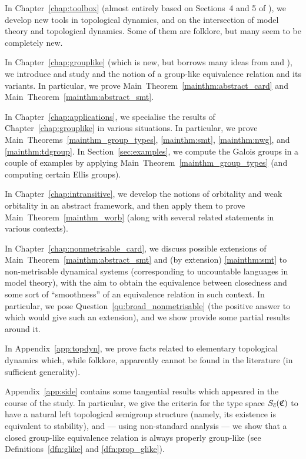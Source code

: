	In Chapter~\ref{chap:toolbox} (almost entirely based on Sections~4 and 5 of \cite{KR18}), we develop new tools in topological dynamics, and on the intersection of model theory and topological dynamics. Some of them are folklore, but many seem to be completely new.
	
	In Chapter~\ref{chap:grouplike} (which is new, but borrows many ideas from \cite{KP17} and \cite{KPR15}), we introduce and study and the notion of a group-like equivalence relation and its variants. In particular, we prove Main~Theorem~\ref{mainthm:abstract_card} and Main~Theorem~\ref{mainthm:abstract_smt}.
	
	In Chapter~\ref{chap:applications}, we specialise the results of Chapter~\ref{chap:grouplike} in various situations. In particular, we prove Main~Theorems~\ref{mainthm_group_types}, \ref{mainthm:smt}, \ref{mainthm:nwg}, and \ref{mainthm:tdgroup}. In Section~\ref{sec:examples}, we compute the Galois groups in a couple of examples by applying Main~Theorem~\ref{mainthm_group_types} (and computing certain Ellis groups).
	
	In Chapter~\ref{chap:intransitive}, we develop the notions of orbitality and weak orbitality in an abstract framework, and then apply them to prove Main~Theorem~\ref{mainthm_worb} (along with several related statements in various contexts).
	
	In Chapter~\ref{chap:nonmetrisable_card}, we discuss possible extensions of Main~Theorem~\ref{mainthm:abstract_smt} and (by extension) \ref{mainthm:smt} to non-metrisable dynamical systems (corresponding to uncountable languages in model theory), with the aim to obtain the equivalence between closedness and some sort of ``smoothness'' of an equivalence relation in such context. In particular, we pose Question~\ref{qu:broad_nonmetrisable} (the positive answer to which would give such an extension), and we show provide some partial results around it.
	
	In Appendix~\ref{app:topdyn}, we prove facts related to elementary topological dynamics which, while folklore, apparently cannot be found in the literature (in sufficient generality).
	
	Appendix~\ref{app:side} contains some tangential results which appeared in the course of the study. In particular, we give the criteria for the type space $S_{\bar c}({\mathfrak C})$ to have a natural left topological semigroup structure (namely, its existence is equivalent to stability), and --- using non-standard analysis --- we show that a closed group-like equivalence relation is always properly group-like (see Definitions~\ref{dfn:glike} and \ref{dfn:prop_glike}).
	
	

